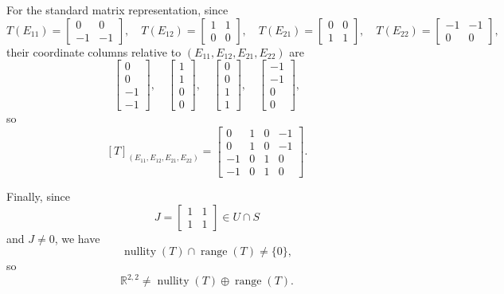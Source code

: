 \documentclass[12pt]{article}
\newcommand{\R}{\mathbb{R}}
\DeclareMathOperator{\Range}{range}
\DeclareMathOperator{\Null}{nullity}
\begin{document}
For the standard matrix representation, since
\[
T(E_{11})=
\begin{bmatrix}0&0\\-1&-1\end{bmatrix},
\quad
T(E_{12})=
\begin{bmatrix}1&1\\0&0\end{bmatrix},
\quad
T(E_{21})=
\begin{bmatrix}0&0\\1&1\end{bmatrix},
\quad
T(E_{22})=
\begin{bmatrix}-1&-1\\0&0\end{bmatrix},
\]
their coordinate columns relative to \((E_{11},E_{12},E_{21},E_{22})\) are
\[
\begin{bmatrix}0\\0\\-1\\-1\end{bmatrix},
\quad
\begin{bmatrix}1\\1\\0\\0\end{bmatrix},
\quad
\begin{bmatrix}0\\0\\1\\1\end{bmatrix},
\quad
\begin{bmatrix}-1\\-1\\0\\0\end{bmatrix},
\]
so
\[
\boxed{
[T]_{(E_{11},E_{12},E_{21},E_{22})}
=
\begin{bmatrix}
0&1&0&-1\\
0&1&0&-1\\
-1&0&1&0\\
-1&0&1&0
\end{bmatrix}.}
\]

Finally, since
\[
J=\begin{bmatrix}1&1\\1&1\end{bmatrix}\in U\cap S
\]
and \(J\neq 0\), we have
\[
\Null(T)\cap \Range(T)\neq \{0\},
\]
so
\[
\boxed{\R^{2,2}\neq \Null(T)\oplus \Range(T).}
\]
\end{document}
